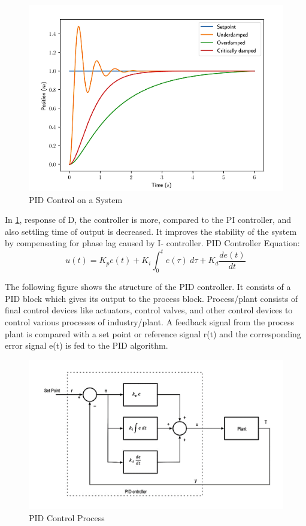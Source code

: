 \documentclass[12pt,a4paper]{book}
\begin{document}
\begin{figure}[h]
  \centering
  \includegraphics[width=14cm]{image10.png}
  \caption{PID Control on a System}
  \label{fig:image10}
\end{figure}

In \ref{fig:image10}, response of D, the controller is more, compared to the PI controller, and also settling time of output is decreased. It improves the stability of the system by compensating for phase lag caused by I- controller. PID Controller Equation: 
\begin{equation}
  u\left(t\right)=K_pe\left(t\right)+K_i\int_{0}^{t}{e\left(\tau\right)\ d\tau}+K_d\frac{de(t)}{dt}
  \label{equation:eq3}
\end{equation}

The following figure shows the structure of the PID controller. It consists of a PID block which gives its output to the process block. Process/plant consists of final control devices like actuators, control valves, and other control devices to control various processes of industry/plant. A feedback signal from the process plant is compared with a set point or reference signal r(t) and the corresponding error signal e(t) is fed to the PID algorithm.

\begin{figure}[h]
  \centering
  \includegraphics[width=12cm]{image11.png}
  \caption{PID Control Process}
  \label{fig:image11}
\end{figure}
\end{document}
